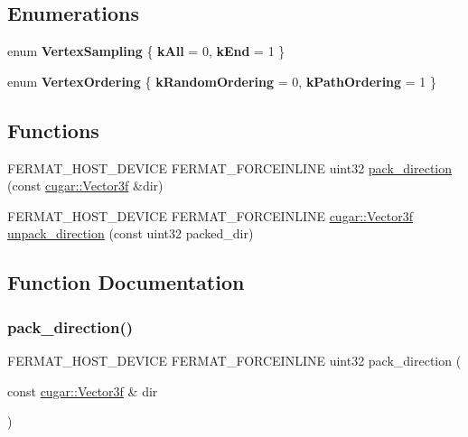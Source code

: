 \subsection*{Enumerations}
\begin{DoxyCompactItemize}
\item 
\mbox{\label{group___vertex_geometry_module_gae2642a40e812bd7932491151c40a1592}} 
enum {\bfseries Vertex\+Sampling} \{ {\bfseries k\+All} = 0, 
{\bfseries k\+End} = 1
 \}
\item 
\mbox{\label{group___vertex_geometry_module_ga6f628f5a47e70cc7301899aa1bd333da}} 
enum {\bfseries Vertex\+Ordering} \{ {\bfseries k\+Random\+Ordering} = 0, 
{\bfseries k\+Path\+Ordering} = 1
 \}
\end{DoxyCompactItemize}
\subsection*{Functions}
\begin{DoxyCompactItemize}
\item 
F\+E\+R\+M\+A\+T\+\_\+\+H\+O\+S\+T\+\_\+\+D\+E\+V\+I\+CE F\+E\+R\+M\+A\+T\+\_\+\+F\+O\+R\+C\+E\+I\+N\+L\+I\+NE uint32 \hyperlink{group___vertex_geometry_module_ga36aaf2cd5d29c0fc2abe5d95f9739f95}{pack\+\_\+direction} (const \hyperlink{structcugar_1_1_vector}{cugar\+::\+Vector3f} \&dir)
\item 
F\+E\+R\+M\+A\+T\+\_\+\+H\+O\+S\+T\+\_\+\+D\+E\+V\+I\+CE F\+E\+R\+M\+A\+T\+\_\+\+F\+O\+R\+C\+E\+I\+N\+L\+I\+NE \hyperlink{structcugar_1_1_vector}{cugar\+::\+Vector3f} \hyperlink{group___vertex_geometry_module_gab56236f4d0e367a082d3dc83df137d79}{unpack\+\_\+direction} (const uint32 packed\+\_\+dir)
\end{DoxyCompactItemize}


\subsection{Function Documentation}
\mbox{\label{group___vertex_geometry_module_ga36aaf2cd5d29c0fc2abe5d95f9739f95}} 
\subsubsection{\texorpdfstring{pack\+\_\+direction()}{pack\_direction()}}
{\footnotesize\ttfamily F\+E\+R\+M\+A\+T\+\_\+\+H\+O\+S\+T\+\_\+\+D\+E\+V\+I\+CE F\+E\+R\+M\+A\+T\+\_\+\+F\+O\+R\+C\+E\+I\+N\+L\+I\+NE uint32 pack\+\_\+direction (\begin{DoxyParamCaption}\item[{const \hyperlink{structcugar_1_1_vector}{cugar\+::\+Vector3f} \&}]{dir }\end{DoxyParamCaption})}


